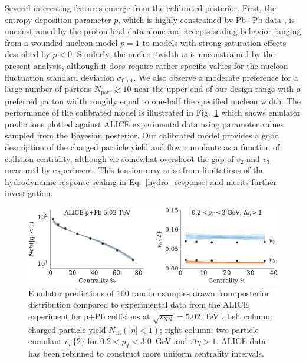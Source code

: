 \documentclass[3p,times,procedia]{elsarticle}
\begin{document}
Several interesting features emerge from the calibrated posterior.
First, the entropy deposition parameter $p$, which is highly constrained by Pb+Pb data \cite{Bernhard:2016tnd}, is unconstrained by the proton-lead data alone and accepts scaling behavior ranging from a wounded-nucleon model $p=1$ to models with strong saturation effects described by $p < 0$.
Similarly, the nucleon width $w$ is unconstrained by the present analysis, although it does require rather specific values for the nucleon fluctuation standard deviation $\sigma_\mathrm{fluct}$.
We also observe a moderate preference for a large number of partons $N_\mathrm{part} \gtrsim 10$ near the upper end of our design range with a preferred parton width roughly equal to one-half the specified nucleon width.
The performance of the calibrated model is illustrated in Fig.~\ref{fig:observables} which shows emulator predictions plotted against ALICE experimental data \cite{Abelev:2014mda} using parameter values sampled from the Bayesian posterior.
Our calibrated model provides a good description of the charged particle yield and flow cumulants as a function of collision centrality, although we somewhat overshoot the gap of $v_2$ and $v_3$ measured by experiment.
This tension may arise from limitations of the hydrodynamic response scaling in Eq.~\eqref{hydro_response} and merits further investigation.
\begin{figure}
  \centering
  \includegraphics{observables_samples}
  \caption{
    \label{fig:observables} Emulator predictions of 100 random samples drawn from posterior distribution compared to experimental data from the ALICE experiment for p+Pb collisions at $\sqrt{s_\mathrm{NN}} = 5.02$~TeV \cite{Abelev:2014mda}.
    Left column: charged particle yield $N_\mathrm{ch}(|\eta| < 1)$; right column: two-particle cumulant $v_n\{2\}$ for $0.2 < p_T < 3.0$~GeV and $\Delta \eta > 1$. ALICE data has been rebinned to construct more uniform centrality intervals.
  }
\end{figure}
\end{document}
